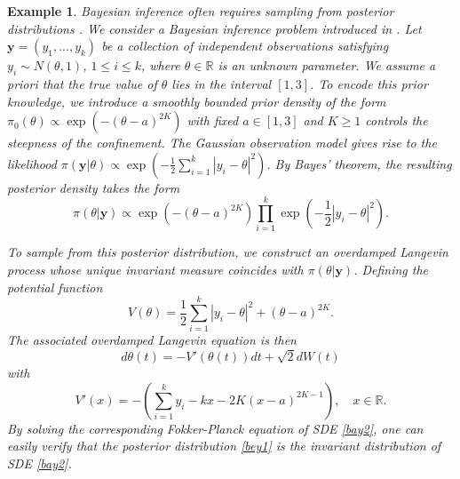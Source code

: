 \documentclass[preprint,12pt,compress]{elsarticle}
\newtheorem{example}{Example}[section]
\begin{document}
\begin{example} {\rm 
Bayesian inference often requires sampling from posterior distributions \cite{gamerman2006markov}.
We consider a Bayesian inference problem introduced in \cite{leroy2024adaptive}. Let $\mathbf{y} = (y_1, ..., y_k)$ be a collection of independent observations satisfying ${y_i} \sim N(\theta ,1)$, $1 \le i \le k$, where $\theta \in \mathbb{R}$ is an unknown parameter. We assume a priori that the true value of $\theta$ lies in the interval $[1, 3]$. To encode this prior knowledge, we introduce a smoothly bounded prior density of the form $\pi_0 (\theta) \propto \exp ( - {(\theta  - a)^{2K}})$ with fixed $a \in [1,3]$ and $K\ge1$ controls the steepness of the confinement. The Gaussian observation model gives rise to the likelihood $\pi (\mathbf{y}| \theta) \propto \exp \left( { - \frac{1}{2}\sum\nolimits_{i = 1}^k {{{\left| {{y_i} - \theta } \right|}^2}} } \right)$. By Bayes' theorem, the resulting posterior density takes the form
\begin{equation}  \label{bey1}
	\pi (\theta |\mathbf{y}) \propto \exp \left( { - {{(\theta  - a)}^{2K}}} \right)\prod\limits_{i = 1}^k {\exp \left( { - \frac{1}{2}{{\left| {{y_i} - \theta } \right|}^2}} \right)}.
\end{equation}

To sample from this posterior distribution, we construct an overdamped Langevin process whose unique invariant measure coincides with $\pi (\theta |\mathbf{y})$. Defining the potential function 
\begin{equation*}
	V(\theta ) = \frac{1}{2}\sum\limits_{i = 1}^k {{{\left| {{y_i} - \theta } \right|}^2}}  + {(\theta  - a)^{2K}}.
\end{equation*}
The associated overdamped Langevin equation is then
\begin{equation}  \label{bay2}
	d\theta(t) =  - V'(\theta(t))dt + \sqrt 2 dW(t)
\end{equation}
with 
\begin{equation*}
	V'(x ) =  - \left( {\sum\limits_{i = 1}^k {{y_i}}  - kx  - 2K{{(x  - a)}^{2K - 1}}} \right),  \quad x\in \mathbb{R}.
\end{equation*}
By solving the corresponding Fokker-Planck equation of SDE \eqref{bay2}, 
one can easily verify that the posterior distribution \eqref{bey1} is the invariant distribution of SDE \eqref{bay2}.

}
\end{example}
\end{document}
